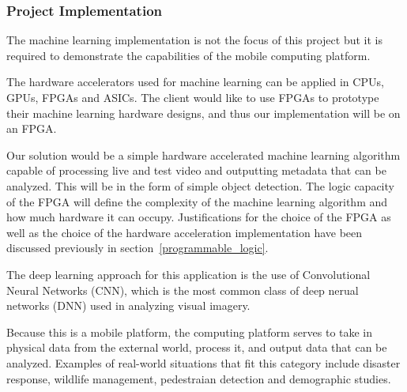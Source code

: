 % 

\subsubsection{Project Implementation}
The machine learning implementation is not the focus of this project but it is required to demonstrate the capabilities of the mobile computing platform. 

The hardware accelerators used for machine learning can be applied in CPUs, GPUs, FPGAs and ASICs. The client would like to use FPGAs to prototype their machine learning hardware designs, and thus our implementation will be on an FPGA.

Our solution would be a simple hardware accelerated machine learning algorithm capable of processing live and test video and outputting metadata that can be analyzed. This will be in the form of simple object detection. The logic capacity of the FPGA will define the complexity of the machine learning algorithm and how much hardware it can occupy. Justifications for the choice of the FPGA as well as the choice of the hardware acceleration implementation have been discussed previously in section~\ref{programmable_logic}.

The deep learning approach for this application is the use of Convolutional Neural Networks (CNN), which is the most common class of deep nerual networks (DNN) used in analyzing visual imagery. 

Because this is a mobile platform, the computing platform serves to take in physical data from the external world, process it, and output data that can be analyzed. Examples of real-world situations that fit this category include disaster response, wildlife management, pedestraian detection and demographic studies.



